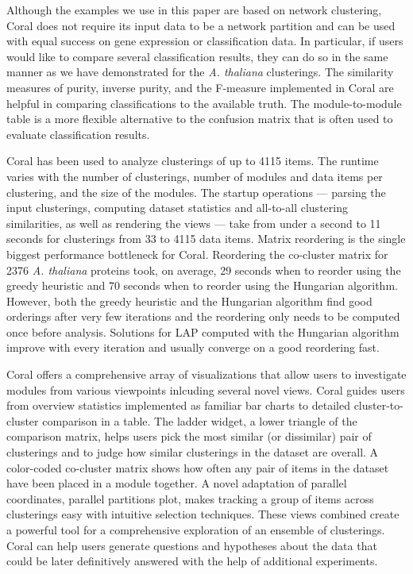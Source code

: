 \documentclass[12pt]{cmuthesis}
\newcommand\Coral{Coral\xspace}
\newcommand{\Athal}{\textit{A. thaliana}\xspace}
\begin{document}
  Although the examples we use in this paper are based on network clustering, \Coral does not require its input data to be a network partition and can be used with equal success on gene expression or classification data. In particular, if users would like to compare several classification results, they can do so in the same manner as we have demonstrated for the \Athal clusterings. The similarity measures of purity, inverse purity, and the F-measure implemented in \Coral are helpful in comparing classifications to the available truth. The module-to-module table is a more flexible alternative to the confusion matrix that is often used to evaluate classification results.

  \Coral has been used to analyze clusterings of up to 4115 items. The runtime varies with the number of clusterings, number of modules and data items per clustering, and the size of the modules. The startup operations --- parsing the input clusterings, computing dataset statistics and all-to-all clustering similarities, as well as rendering the views --- take from under a second to 11 seconds for clusterings from 33 to 4115 data items. Matrix reordering is the single biggest performance bottleneck for \Coral. Reordering the co-cluster matrix for 2376 \Athal proteins took, on average, 29 seconds when to reorder using the greedy heuristic and 70 seconds when to reorder using the Hungarian algorithm. However, both the greedy heuristic and the Hungarian algorithm find good orderings after very few iterations and the reordering only needs to be computed once before analysis. Solutions for LAP computed with the Hungarian algorithm improve with every iteration and usually converge on a good reordering fast.

  \Coral offers a comprehensive array of visualizations that allow users to investigate modules from various viewpoints inlcuding several novel views. \Coral guides users from overview statistics implemented as familiar bar charts to detailed cluster-to-cluster comparison in a table. The ladder widget, a lower triangle of the comparison matrix, helps users pick the most similar (or dissimilar) pair of clusterings and to judge how similar clusterings in the dataset are overall. A color-coded co-cluster matrix shows how often any pair of items in the dataset have been placed in a module together. A novel adaptation of parallel coordinates, parallel partitions plot, makes tracking a group of items across clusterings easy with intuitive selection techniques. These views combined create a powerful tool for a comprehensive exploration of an ensemble of clusterings. \Coral can help users generate questions and hypotheses about the data that could be later definitively answered with the help of additional experiments.
\end{document}
